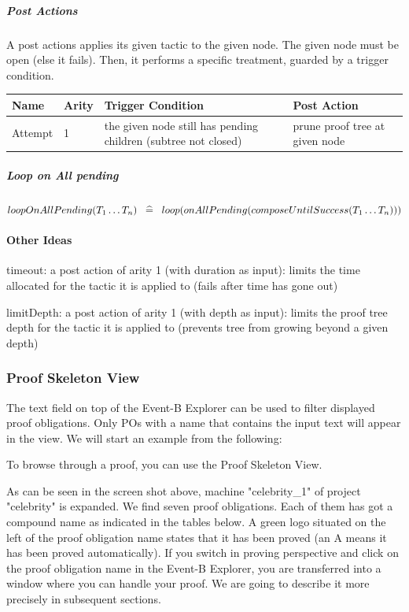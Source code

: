 \subparagraph{Post Actions}

A post actions applies its given tactic to the given node. The given node must be open (else it fails). Then, it performs a specific treatment, guarded by a trigger condition. 

\begin{center}
    \begin{tabular}{ | l | l | l | l | p{5cm} |}
    \hline
	Name & Arity & Trigger Condition & Post Action \\ \hline
	Attempt & 1 & the given node still has pending children (subtree not closed) & prune proof tree at given node  \\ \hline
    \end{tabular}
\end{center}

\subparagraph{Loop on All pending}

$loopOnAllPending(T_1 \ldots T_n) \;\;\mathrel{\widehat=}\;\; loop(onAllPending(composeUntilSuccess(T_1 \ldots T_n)))  $

\paragraph{Other Ideas}

    timeout: a post action of arity 1 (with duration as input): limits the time allocated for the tactic it is applied to (fails after time has gone out)

    limitDepth: a post action of arity 1 (with depth as input): limits the proof tree depth for the tactic it is applied to (prevents tree from growing beyond a given depth) 

\subsubsection{Proof Skeleton View}


The text field on top of the \textsf{Event-B Explorer} can be used to filter displayed proof obligations. Only POs with a name that contains the input text will appear in the view. We will start an example from the following: 

To browse through a proof, you can use the Proof Skeleton View.

As can be seen in the screen shot above, machine "celebrity\_1" of project "celebrity" is expanded. We find seven proof obligations. Each of them has got a compound name as indicated in the tables below. A green logo situated on the left of the proof obligation name states that it has been proved (an A means it has been proved automatically). If you switch in proving perspective and click on the proof obligation name in the Event-B Explorer, you are transferred into a window where you can handle your proof. We are going to describe it more precisely in subsequent sections.



